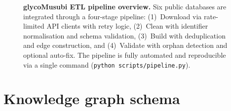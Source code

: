 \documentclass[11pt,a4paper]{article}
\begin{document}
\begin{figure}[H]
\caption{\textbf{glycoMusubi ETL pipeline overview.} Six public databases are
integrated through a four-stage pipeline: (1)~Download via rate-limited API
clients with retry logic, (2)~Clean with identifier normalisation and schema
validation, (3)~Build with deduplication and edge construction, and
(4)~Validate with orphan detection and optional auto-fix. The pipeline is
fully automated and reproducible via a single command
(\texttt{python scripts/pipeline.py}).}
\label{fig:etl_pipeline}
\end{figure}

\section{Knowledge graph schema}
\label{sec:schema}
\end{document}
